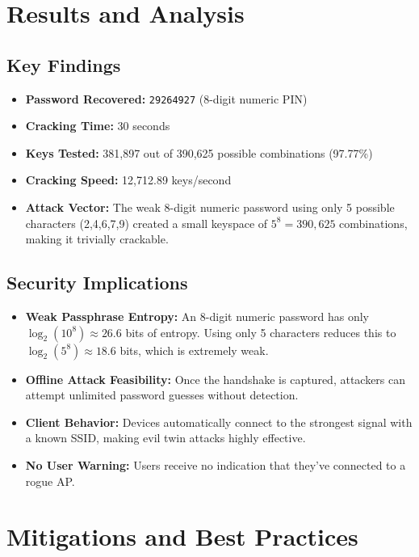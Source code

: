 \documentclass[11pt,a4paper]{article}
\begin{document}
\section{Results and Analysis}

\subsection{Key Findings}
\begin{itemize}[leftmargin=1.6em]
  \item \textbf{Password Recovered:} \texttt{29264927} (8-digit numeric PIN)
  \item \textbf{Cracking Time:} 30 seconds
  \item \textbf{Keys Tested:} 381,897 out of 390,625 possible combinations (97.77\%)
  \item \textbf{Cracking Speed:} 12,712.89 keys/second
  \item \textbf{Attack Vector:} The weak 8-digit numeric password using only 5 possible 
        characters (2,4,6,7,9) created a small keyspace of $5^8 = 390,625$ combinations, 
        making it trivially crackable.
\end{itemize}

\subsection{Security Implications}
\begin{itemize}[leftmargin=1.6em]
  \item \textbf{Weak Passphrase Entropy:} An 8-digit numeric password has only 
        $\log_2(10^8) \approx 26.6$ bits of entropy. Using only 5 characters reduces 
        this to $\log_2(5^8) \approx 18.6$ bits, which is extremely weak.
  \item \textbf{Offline Attack Feasibility:} Once the handshake is captured, attackers 
        can attempt unlimited password guesses without detection.
  \item \textbf{Client Behavior:} Devices automatically connect to the strongest signal 
        with a known SSID, making evil twin attacks highly effective.
  \item \textbf{No User Warning:} Users receive no indication that they've connected 
        to a rogue AP.
\end{itemize}

\section{Mitigations and Best Practices}
\end{document}
